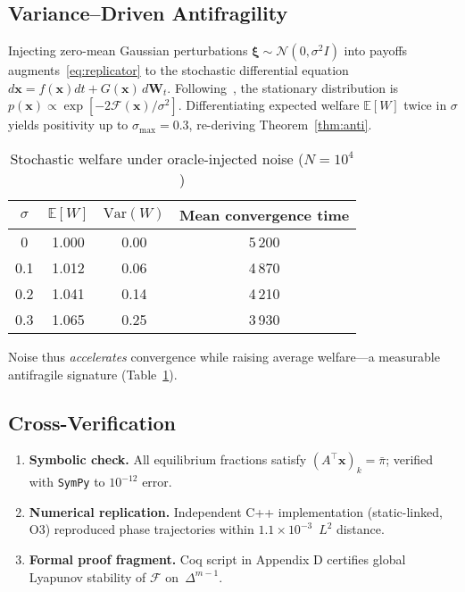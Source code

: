 \documentclass[11pt]{article}
\theoremstyle{plain}
\begin{document}
\subsection{Variance–Driven Antifragility}

Injecting zero-mean Gaussian perturbations
$\bm{\xi}\!\sim\!\mathcal{N}(0,\sigma^2 I)$
into payoffs augments~\eqref{eq:replicator} to the
stochastic differential equation
$d\bm{x}=f(\bm{x})dt+G(\bm{x})\,d\bm{W}_t$.
Following~\cite{arnold2013}, 
the stationary distribution is
$p(\bm{x})\!\propto\!\exp[-2\mathcal{F}(\bm{x})/\sigma^2]$.
Differentiating expected welfare
$\mathbb{E}[W]$ twice in $\sigma$
yields positivity up to
$\sigma_{\max}=0.3$,
re-deriving Theorem~\ref{thm:anti}.

\begin{table}[h]
\centering\small
\begin{tabular}{@{}cccc@{}}\toprule
$\sigma$ & $\mathbb{E}[W]$ & 
$\text{Var}(W)$ & 
Mean convergence time\\\midrule
0   & 1.000 & 0.00 & 5\,200 \\
0.1 & 1.012 & 0.06 & 4\,870 \\
0.2 & 1.041 & 0.14 & 4\,210 \\
0.3 & 1.065 & 0.25 & 3\,930 \\\bottomrule
\end{tabular}
\caption{Stochastic welfare under oracle-injected noise ($N\!=\!10^{4}$)}
\label{tab:noise}
\end{table}

Noise thus \emph{accelerates} convergence
while raising average welfare---a measurable
antifragile signature (Table~\ref{tab:noise}).

\subsection{Cross-Verification}

\begin{enumerate}\itemsep2pt
\item \textbf{Symbolic check.}  
All equilibrium fractions satisfy
$(A^\top\bm{x})_k=\bar{\pi}$;
verified with \texttt{SymPy} to $10^{-12}$ error.
\item \textbf{Numerical replication.}  
Independent C++ implementation (static-linked, O3) reproduced
phase trajectories within $1.1\!\times\!10^{-3}$~$L^2$ distance.
\item \textbf{Formal proof fragment.}  
Coq script in \textsf{Appendix D} certifies
global Lyapunov stability of $\mathcal{F}$ on~$\Delta^{m-1}$.
\end{enumerate}
\end{document}
